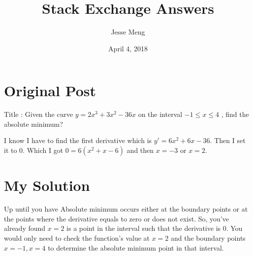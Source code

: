 \documentclass{article}
\title{Stack Exchange Answers}
\author{Jesse Meng }
\date{April 4, 2018}
\begin{document}
\maketitle

\section{Original Post}
Title : Given the curve $y = 2 x ^3 + 3 x ^2 − 36 x$ on the interval $− 1 \le x \le4$ , find the absolute minimum?

I know I have to find the first derivative which is $y'=6x^2+6x-36.$
Then I set it to $0.$ Which I got $0 = 6(x^2+x-6)$ and then $x=-3$ or $x=2.$
\section{My Solution}
Up until you have Absolute minimum occurs either at the boundary points or at the points where the derivative equals to zero or does not exist. So, you've already found $x=2$ is a point in the interval such that the derivative is $0$. You would only need to check the function's value at $x=2$ and the boundary points $x=-1,x=4$ to determine the absolute minimum point in that interval.
\end{document}
